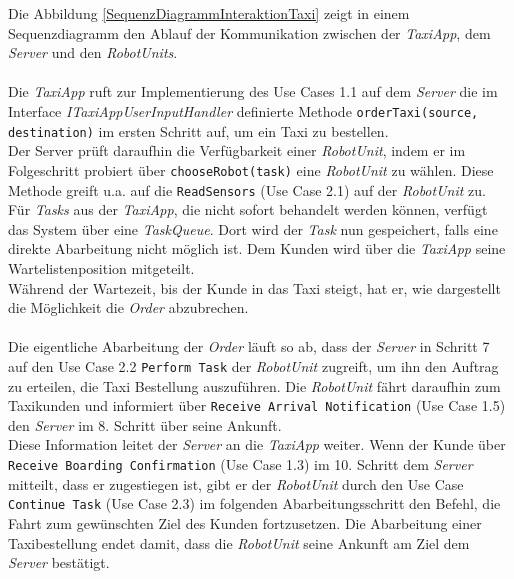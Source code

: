 Die Abbildung \ref{SequenzDiagrammInteraktionTaxi} zeigt in einem Sequenzdiagramm den Ablauf der Kommunikation zwischen der \emph{TaxiApp}, dem \emph{Server} und den \emph{RobotUnits}.\\ \\
Die \emph{TaxiApp} ruft zur Implementierung des Use Cases 1.1 auf dem \emph{Server} die im Interface \emph{ITaxiAppUserInputHandler} definierte Methode \texttt{orderTaxi(source, destination)} im ersten Schritt auf, um ein Taxi zu bestellen. \\
Der Server prüft daraufhin die Verfügbarkeit einer \emph{RobotUnit}, indem er im Folgeschritt probiert über \texttt{chooseRobot(task)} eine \emph{RobotUnit} zu wählen. Diese Methode greift u.a. auf die \texttt{ReadSensors} (Use Case 2.1) auf der \emph{RobotUnit} zu.
Für \emph{Tasks} aus der \emph{TaxiApp}, die nicht sofort behandelt werden können, verfügt das System über eine \emph{TaskQueue}. Dort wird der \emph{Task} nun gespeichert, falls eine direkte Abarbeitung nicht möglich ist. Dem Kunden wird über die \emph{TaxiApp} seine Wartelistenposition mitgeteilt. \\
Während der Wartezeit, bis der Kunde in das Taxi steigt, hat er, wie dargestellt die Möglichkeit die \emph{Order} abzubrechen. \\ \\
Die eigentliche Abarbeitung der \emph{Order} läuft so ab, dass der \emph{Server} in Schritt 7 auf den Use Case 2.2 \texttt{Perform Task} der \emph{RobotUnit} zugreift, um ihn den Auftrag zu erteilen, die Taxi Bestellung auszuführen. Die \emph{RobotUnit} fährt daraufhin zum Taxikunden und informiert über \texttt{Receive Arrival Notification} (Use Case 1.5) den \emph{Server} im 8. Schritt über seine Ankunft. \\
Diese Information leitet der \emph{Server} an die \emph{TaxiApp} weiter. Wenn der Kunde über \texttt{Receive Boarding Confirmation} (Use Case 1.3) im 10. Schritt dem \emph{Server} mitteilt, dass er zugestiegen ist, gibt er der \emph{RobotUnit} durch den Use Case \texttt{Continue Task} (Use Case 2.3) im folgenden Abarbeitungsschritt den Befehl, die Fahrt zum gewünschten Ziel des Kunden fortzusetzen. Die Abarbeitung einer Taxibestellung endet damit, dass die \emph{RobotUnit} seine Ankunft am Ziel dem \emph{Server} bestätigt.


